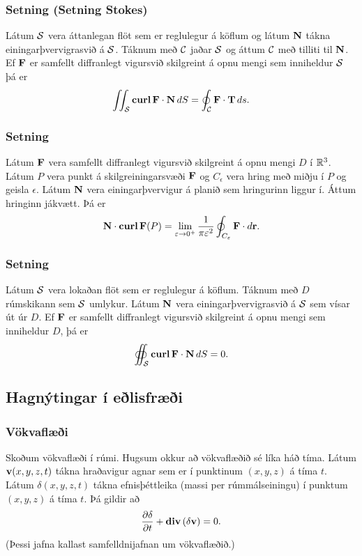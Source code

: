 \subsubsection{Setning \rtask{} (Setning Stokes)}
Látum $\cal S$ vera áttanlegan flöt
sem er reglulegur á köflum og látum $\mbox{${\bf N}$}$ tákna einingarþvervigrasvið
á $\cal S$.  Táknum með $\cal C$ jaðar $\cal S$ og
áttum $\cal C$ með tilliti til $\mbox{${\bf N}$}$.    
Ef $\mbox{${\bf F}$}$ er samfellt diffranlegt vigursvið
skilgreint á opnu mengi sem inniheldur $\cal S$  þá er  
$$\int\!\!\!\int_{\cal S} \mbox{${\rm\bf curl\,}$}\mbox{${\bf F}$}\cdot\mbox{${\bf N}$}\,dS=\oint_{\cal C}\mbox{${\bf F}$}\cdot \mbox{${\bf T}$}\,ds.$$



\subsubsection{Setning \rtask{}}
 Látum $\mbox{${\bf F}$}$ vera samfellt
diffranlegt vigursvið skilgreint á opnu mengi $D$ í ${\mathbb R}^3$.    Látum
$P$ vera punkt á skilgreiningarsvæði $\mbox{${\bf F}$}$ og $C_\epsilon$ vera
hring með miðju í $P$ og geisla $\epsilon$.  Látum $\mbox{${\bf N}$}$ vera
einingarþvervigur á planið sem hringurinn liggur í.  Áttum hringinn
jákvætt.
Þá er
$$\mbox{${\bf N}$}\cdot\mbox{${\rm\bf curl\,}$} \mbox{${\bf F}$}(P)=\lim_{\varepsilon\rightarrow 0^+}
\frac{1}{\pi\varepsilon^2}\oint_{C_\varepsilon}\mbox{${\bf F}$}\cdot d\mbox{${\bf r}$}.$$
   


\subsubsection{Setning \rtask{}}
Látum $\cal S$ vera lokaðan flöt sem er
reglulegur á köflum.  Táknum með $D$ rúmskikann sem $\cal S$ umlykur.
Látum $\mbox{${\bf N}$}$ vera einingarþvervigrasvið á $\cal S$   sem vísar út úr
$D$.  Ef $\mbox{${\bf F}$}$ er samfellt diffranlegt vigursvið skilgreint á opnu
mengi sem inniheldur $D$, 
þá er 
$$\oiint_{\cal S}\mbox{${\rm\bf curl\,}$}\mbox{${\bf F}$}\cdot\mbox{${\bf N}$}\,dS=0.$$



\subsection{Hagnýtingar í eðlisfræði} 

\subsubsection{Vökvaflæði \rtask{}}
Skoðum vökvaflæði í rúmi.  Hugsum okkur að vökvaflæðið sé líka háð tíma.  Látum $\mbox{${\bf v}$}(x,y,z,t)$ tákna hraðavigur agnar sem er í punktinum  $(x,y,z)$ á tíma $t$.  Látum $\delta(x,y,z,t)$ tákna efnisþéttleika (massi per rúmmálseiningu) í punktum $(x,y,z)$ á tíma $t$.  Þá gildir að 
$$\frac{\partial \delta}{\partial t}+\mbox{${\rm\bf div\,}$}(\delta\mbox{${\bf v}$})=0.$$
(Þessi jafna kallast samfelldnijafnan um vökvaflæðið.)


